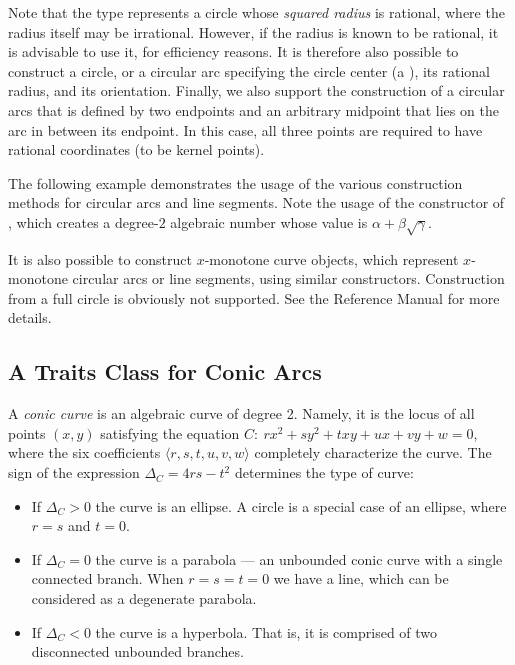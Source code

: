Note that the  type represents a circle whose
\emph{squared radius} is rational, where the radius itself may be irrational.
However, if the radius is known to be rational, it is advisable to use it,
for efficiency reasons. It is therefore also possible to construct a circle,
or a circular arc specifying the circle center (a ), its
rational radius, and its orientation. Finally, we also support the construction
of a circular arcs that is defined by two endpoints and an arbitrary midpoint
that lies on the arc in between its endpoint. In this case, all three points
are required to have rational coordinates (to be kernel points).

The following example demonstrates the usage of the various construction
methods for circular arcs and line segments. Note the usage of the constructor
of , which creates a degree-$2$ algebraic
number whose value is $\alpha + \beta\sqrt{\gamma}$.


It is also possible to construct $x$-monotone curve objects, which represent
$x$-monotone circular arcs or line segments, using similar constructors.
Construction from a full circle is obviously not supported. See the Reference
Manual for more details.

\subsection{A Traits Class for Conic Arcs}
\label{arr_ssec:tr_conic}

A {\em conic curve} is an algebraic curve of degree 2. Namely, it
is the locus of all points $(x,y)$ satisfying the equation $C:\ r
x^2 + s y^2 + t xy + u x + v y + w = 0$, where the six
coefficients $\langle r, s, t, u, v, w \rangle$ completely
characterize the curve. The sign of the expression $\Delta_{C} = 4
r s - t^2$ determines the type of curve:
\begin{itemize}
\item If $\Delta_{C} > 0$ the curve is an ellipse. A circle is a
special case of an ellipse, where $r = s$ and $t = 0$.
%
\item If $\Delta_{C} = 0$ the curve is a parabola --- an unbounded
conic curve with a single connected branch. When $r = s = t = 0$
we have a line, which can be considered as a degenerate parabola.
%
\item If $\Delta_{C} < 0$ the curve is a hyperbola. That is, it
is comprised of two disconnected unbounded branches.
\end{itemize}

